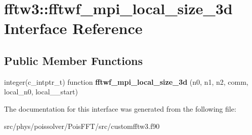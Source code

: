 \hypertarget{interfacefftw3_1_1fftwf__mpi__local__size__3d}{}\section{fftw3\+:\+:fftwf\+\_\+mpi\+\_\+local\+\_\+size\+\_\+3d Interface Reference}
\label{interfacefftw3_1_1fftwf__mpi__local__size__3d}
\subsection*{Public Member Functions}
\begin{DoxyCompactItemize}
\item 
integer(c\+\_\+intptr\+\_\+t) function {\bfseries fftwf\+\_\+mpi\+\_\+local\+\_\+size\+\_\+3d} (n0, n1, n2, comm, local\+\_\+n0, local\+\_\+\_\+start)\hypertarget{interfacefftw3_1_1fftwf__mpi__local__size__3d_ab6c5a7eebf522254bbedae6c45faaa99}{}\label{interfacefftw3_1_1fftwf__mpi__local__size__3d_ab6c5a7eebf522254bbedae6c45faaa99}

\end{DoxyCompactItemize}


The documentation for this interface was generated from the following file\+:\begin{DoxyCompactItemize}
\item 
src/phys/poissolver/\+Pois\+F\+F\+T/src/customfftw3.\+f90\end{DoxyCompactItemize}

